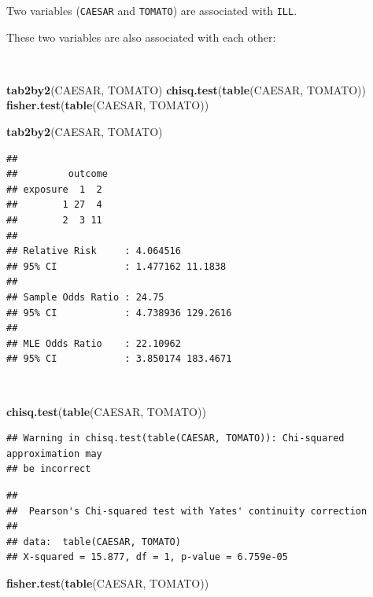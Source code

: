 \documentclass[12pt,a4paper]{book}
\newenvironment{Shaded}{\begin{snugshade}}{\end{snugshade}}
\newcommand{\KeywordTok}[1]{\textcolor[rgb]{0.13,0.29,0.53}{\textbf{#1}}}
\newcommand{\NormalTok}[1]{#1}
\theoremstyle{definition}
\theoremstyle{definition}
\theoremstyle{definition}
\theoremstyle{remark}
\begin{document}
\newpage

Two variables (\texttt{CAESAR} and \texttt{TOMATO}) are associated with
\texttt{ILL}.

These two variables are also associated with each other:

~

\begin{Shaded}
\begin{Highlighting}[]
\KeywordTok{tab2by2}\NormalTok{(CAESAR, TOMATO)}
\KeywordTok{chisq.test}\NormalTok{(}\KeywordTok{table}\NormalTok{(CAESAR, TOMATO))}
\KeywordTok{fisher.test}\NormalTok{(}\KeywordTok{table}\NormalTok{(CAESAR, TOMATO))}
\end{Highlighting}
\end{Shaded}

\begin{Shaded}
\begin{Highlighting}[]
\KeywordTok{tab2by2}\NormalTok{(CAESAR, TOMATO)}
\end{Highlighting}
\end{Shaded}

\begin{verbatim}
## 
##         outcome
## exposure  1  2
##        1 27  4
##        2  3 11
## 
## Relative Risk     : 4.064516 
## 95% CI            : 1.477162 11.1838 
## 
## Sample Odds Ratio : 24.75 
## 95% CI            : 4.738936 129.2616 
## 
## MLE Odds Ratio    : 22.10962 
## 95% CI            : 3.850174 183.4671
\end{verbatim}

~

\begin{Shaded}
\begin{Highlighting}[]
\KeywordTok{chisq.test}\NormalTok{(}\KeywordTok{table}\NormalTok{(CAESAR, TOMATO))}
\end{Highlighting}
\end{Shaded}

\begin{verbatim}
## Warning in chisq.test(table(CAESAR, TOMATO)): Chi-squared approximation may
## be incorrect
\end{verbatim}

\begin{verbatim}
## 
##  Pearson's Chi-squared test with Yates' continuity correction
## 
## data:  table(CAESAR, TOMATO)
## X-squared = 15.877, df = 1, p-value = 6.759e-05
\end{verbatim}

\newpage

\begin{Shaded}
\begin{Highlighting}[]
\KeywordTok{fisher.test}\NormalTok{(}\KeywordTok{table}\NormalTok{(CAESAR, TOMATO))}
\end{Highlighting}
\end{Shaded}
\end{document}
